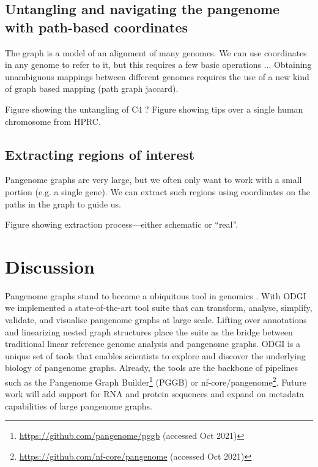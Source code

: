 \documentclass{bioinfo}
\begin{document}
\subsection{Untangling and navigating the pangenome with path-based coordinates}


The graph is a model of an alignment of many genomes.
We can use coordinates in any genome to refer to it, but this requires a few basic operations ...
Obtaining unambiguous mappings between different genomes requires the use of a new kind of graph based mapping (path graph jaccard).

Figure showing the untangling of C4 ?
Figure showing tips over a single human chromosome from HPRC.

\subsection{Extracting regions of interest}


Pangenome graphs are very large, but we often only want to work with a small portion (e.g. a single gene).
We can extract such regions using coordinates on the paths in the graph to guide us.

Figure showing extraction process---either schematic or ``real''.

\section{Discussion}


Pangenome graphs stand to become a ubiquitous tool in genomics \citep{Eizenga_2020}. With ODGI we implemented a state-of-the-art tool suite that can transform, analyse, simplify, validate, and visualise pangenome graphs at large scale. Lifting over annotations and linearizing nested graph structures place the suite as the bridge between traditional linear reference genome analysis and pangenome graphs. ODGI is a unique set of tools that enables scientists to explore and discover the underlying biology of pangenome graphs. Already, the tools are the backbone of pipelines such as the Pangenome Graph Builder\footnote{\url{https://github.com/pangenome/pggb} (accessed Oct 2021)} (PGGB) or nf-core/pangenome\footnote{\url{https://github.com/nf-core/pangenome} (accessed Oct 2021)}. Future work will add support for RNA and protein sequences and expand on metadata capabilities of large pangenome graphs.
\end{document}
